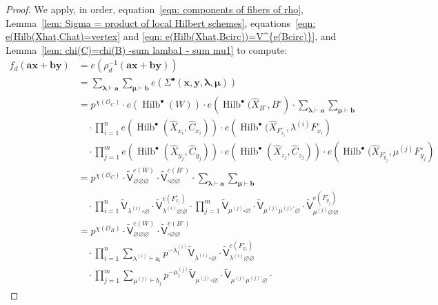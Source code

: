 \documentclass[12pt]{amsart}
\theoremstyle{definition}
\renewcommand{\O}{\mathcal{O}}
\newcommand{\sfVtilde}{\widetilde{\mathsf{V}}}
\newcommand{\Hilb}{\operatorname{Hilb}}
\newcommand{\boldx}{\boldsymbol{x}}
\newcommand{\boldy}{\boldsymbol{y}}
\newcommand{\bolda}{\boldsymbol{a}}
\newcommand{\boldb}{\boldsymbol{b}}
\newcommand{\boldlambda}{\boldsymbol{\lambda }}
\newcommand{\boldmu}{\boldsymbol{\mu }}
\newcommand{\Sigmaxylambdamu}{\Sigma^{\bullet }(\boldx ,\boldy ,\boldlambda ,\boldmu )}
\renewcommand{\emptyset}{\varnothing}
\renewcommand{\hat}{\widehat}
\newcommand{\Xhat}{\widehat{X}}
\newcommand{\bx}{\square}
\newcommand{\mujprime}{\mu^{(j)\prime}}
\begin{document}
\begin{proof}
We apply, in order, equation~\eqref{eqn: components of fibers of rho},
Lemma~\ref{lem: Sigma = product of local Hilbert schemes},
equations~\eqref{eqn: e(Hilb(Xhat,Chat)=vertex} and \eqref{eqn:
e(Hilb(Xhat,Bcirc))=V^{e(Bcirc)}}, and Lemma~\ref{lem: chi(C)=chi(B)
-sum lamba1 - sum mu1} to compute:
\begin{align*}
f_{d}(\bolda \boldx +\boldb \boldy )&= e\left(\rho_{d}^{-1}(\bolda
\boldx +\boldb \boldy) \right) \\
&= \sum_{\boldlambda \vdash \bolda}\sum_{\boldmu \vdash \boldb} e\left(\Sigmaxylambdamu \right)\\
&=p^{\chi (\O_{C})} \cdot e(\Hilb^{\bullet}(W)) \cdot
e\left(\Hilb^{\bullet}(\Xhat_{B^{\circ}},B^{\circ} \right) \cdot
\sum_{\boldlambda \vdash \bolda}\sum_{\boldmu
\vdash \boldb}\\
& \quad  \cdot \prod_{i=1}^{n}
e\left(\Hilb^{\bullet}(\Xhat_{x_{i}},\hat{C}_{x_{i}}) \right) \cdot
e\left(\Hilb^{\bullet}(\Xhat_{F^{\circ}_{x_{i}}},\lambda^{(i)}F^{\circ}_{x_{i}}
\right) \\
& \quad  \cdot   \prod_{j=1}^{m}
e\left(\Hilb^{\bullet}(\Xhat_{y_{j}},\hat{C}_{y_{j}}) \right) \cdot
e\left(\Hilb^{\bullet}(\Xhat_{z_{j}},\hat{C}_{z_{j}}) \right) \cdot
e\left(\Hilb^{\bullet}(\Xhat_{F^{\circ}_{y_{j}}},\mu^{(j)}F^{\circ}_{y_{j}}
\right)\\
&=p^{\chi (\O_{C})}\cdot \sfVtilde_{\emptyset \emptyset
\emptyset}^{e(W)} \cdot \sfVtilde^{e(B^{\circ})}_{\bx \emptyset
\emptyset} \cdot  \sum_{\boldlambda \vdash \bolda}\sum_{\boldmu
\vdash \boldb}\\
& \quad \cdot \prod_{i=1}^{n} \sfVtilde_{\lambda^{(i)}\bx \emptyset}
\cdot \sfVtilde^{e(F^{\circ}_{x_{i}})}_{\lambda^{(i)}\emptyset
\emptyset} \cdot \prod_{j=1}^{m} \sfVtilde_{\mu^{(j)}\bx \emptyset}
\cdot \sfVtilde_{\mu^{(j)} \mujprime \emptyset }\cdot
\sfVtilde^{e(F^{\circ}_{y_{j}})}_{\mu^{(j)}\emptyset \emptyset} \\
&=p^{\chi (\O_{B})}\cdot \sfVtilde_{\emptyset \emptyset
\emptyset}^{e(W)} \cdot \sfVtilde^{e(B^{\circ})}_{\bx \emptyset
\emptyset}\\
&\quad \cdot \prod_{i=1}^{n} \sum_{\lambda^{(i)}\vdash a_{i}}
p^{-\lambda_{1}^{(i)}} \sfVtilde_{\lambda^{(i)}\bx \emptyset} \cdot
\sfVtilde^{e(F^{\circ}_{x_{i}})}_{\lambda^{(i)}\emptyset \emptyset}\\
&\quad \cdot \prod_{j=1}^{m} \sum_{\mu^{(j)}\vdash b_{j}}
p^{-\mu_{1}^{(j)}} \sfVtilde_{\mu^{(j)} \bx \emptyset} \cdot
\sfVtilde_{\mu^{(j)} \mujprime \emptyset }\cdot

\end{align*}
\end{proof}
\end{document}
